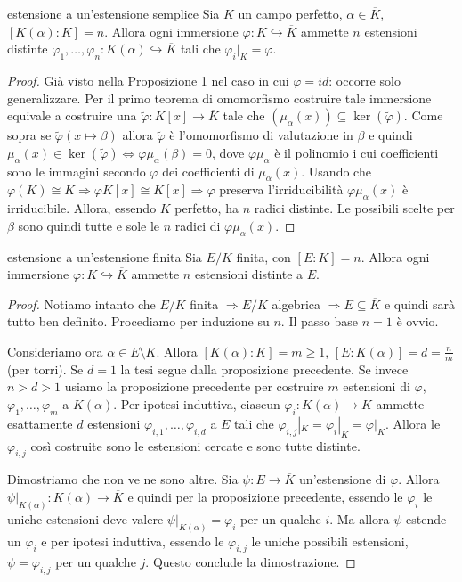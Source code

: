 \begin{proposition}{estensione a un'estensione semplice}
    Sia $K$ un campo perfetto, $\alpha \in \overline{K}$, $[K(\alpha):K] = n$. Allora ogni immersione $\varphi: K \hookrightarrow \overline{K}$ ammette $n$ estensioni distinte $\varphi_1,\dots,\varphi_n: K(\alpha) \hookrightarrow \overline{K}$ tali che $\varphi_i|_K = \varphi$.
\end{proposition}
\begin{proof}
    Già visto nella Proposizione 1 nel caso in cui $\varphi = id$: occorre solo generalizzare.
    Per il primo teorema di omomorfismo costruire tale immersione equivale a costruire una $\tilde \varphi: K[x] \rightarrow \overline{K}$ tale che $(\mu_{\alpha}(x)) \subseteq \ker(\tilde \varphi)$. Come sopra se $\tilde \varphi(x \mapsto \beta)$ allora $\tilde \varphi$ è l'omomorfismo di valutazione in $\beta$ e quindi $\mu_{\alpha}(x) \in \ker(\tilde \varphi) \iff \varphi\mu_{\alpha}(\beta) = 0$, dove $\varphi\mu_{\alpha}$ è il polinomio i cui coefficienti sono le immagini secondo $\varphi$ dei coefficienti di $\mu_{\alpha}(x)$. Usando che $\varphi(K) \cong K \Rightarrow \varphi K[x] \cong K[x] \Rightarrow \varphi$ preserva l'irriducibilità $\varphi\mu_{\alpha}(x)$ è irriducibile. Allora, essendo $K$ perfetto, ha $n$ radici distinte. Le possibili scelte per $\beta$ sono quindi tutte e sole le $n$ radici di $\varphi\mu_{\alpha}(x)$.
\end{proof}
\begin{proposition}{estensione a un'estensione finita}
    Sia $E/K$ finita, con $[E:K] = n$. Allora ogni immersione $\varphi: K \hookrightarrow \overline{K}$ ammette $n$ estensioni distinte a $E$.
\end{proposition}
\begin{proof}
    Notiamo intanto che $E/K$ finita $\Rightarrow E/K$ algebrica $\Rightarrow E \subseteq \overline{K}$ e quindi sarà tutto ben definito. Procediamo per induzione su $n$. Il passo base $n=1$ è ovvio.

    Consideriamo ora $\alpha \in E \setminus K$. Allora $[K(\alpha) : K] = m \geq 1$, $[E : K(\alpha)] = d = \frac{n}{m}$ (per torri). Se $d=1$ la tesi segue dalla proposizione precedente. Se invece $n >d>1$ usiamo la proposizione precedente per costruire $m$ estensioni di $\varphi$, $\varphi_1,\dots, \varphi_m$ a $K(\alpha)$. Per ipotesi induttiva, ciascun $\varphi_i:K(\alpha) \rightarrow \overline{K}$ ammette esattamente $d$ estensioni $\varphi_{i,1},\dots,\varphi_{i,d}$ a $E$ tali che $\varphi_{i,j}|_K = \varphi_i|_K = \varphi|_K$. Allora le $\varphi_{i,j}$ così costruite sono le estensioni cercate e sono tutte distinte.
    
    Dimostriamo che non ve ne sono altre. Sia $\psi: E \rightarrow \overline{K}$ un'estensione di $\varphi$. Allora $\psi|_{K(\alpha)}: K(\alpha) \rightarrow \overline{K}$ e quindi per la proposizione precedente, essendo le $\varphi_i$ le uniche estensioni deve valere $\psi|_{K(\alpha)} = \varphi_i$ per un qualche $i$. Ma allora $\psi$ estende un $\varphi_i$ e per ipotesi induttiva, essendo le $\varphi_{i,j}$ le uniche possibili estensioni, $\psi = \varphi_{i,j}$ per un qualche $j$. Questo conclude la dimostrazione. 
\end{proof}
